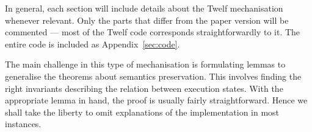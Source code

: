In general, each section will include details about the Twelf mechanisation whenever relevant.
Only the parts that differ from the paper version will be commented --- most of the Twelf code corresponds straightforwardly to it.
The entire code is included as Appendix~\ref{sec:code}.

The main challenge in this type of mechanisation is formulating lemmas to generalise the theorems about semantics preservation.
This involves finding the right invariants describing the relation between execution states.
With the appropriate lemma in hand, the proof is usually fairly straightforward.
Hence we shall take the liberty to omit explanations of the implementation in most instances.
